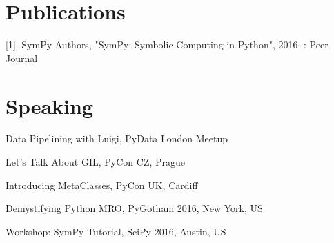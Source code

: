 \documentclass[]{deedy-resume-openfont}
\begin{document}
\begin{minipage}[t]{0.66\textwidth}

\section{Publications} 
\renewcommand\refname{\vskip -1.5cm} %


\nocite{*}
[1]. SymPy Authors, "SymPy: Symbolic Computing in Python", 2016. : Peer Journal


\section{Speaking}
\begin{tightemize}
\item Data Pipelining with Luigi, PyData London Meetup 
\item Let's Talk About GIL, PyCon CZ, Prague
\item Introducing MetaClasses, PyCon UK, Cardiff
\item Demystifying Python MRO, PyGotham 2016, New York, US
\item Workshop: SymPy Tutorial, SciPy 2016, Austin, US
\end{tightemize}




\end{minipage} 
\end{document}
